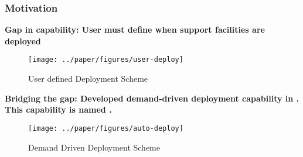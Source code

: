   \begin{frame}
    \frametitle{Motivation}

    \textbf{Gap in capability: User must define when support facilities are deployed} 

    \begin{figure}[htbp!]
      \begin{center}
        \texttt{[image: ../paper/figures/user-deploy]}
      \end{center}
            \caption{User defined Deployment Scheme }
    \end{figure}

    \textbf{Bridging the gap: Developed demand-driven deployment capability in \Cyclus. This capability is named \deploy.}

    \begin{figure}[htbp!]
      \begin{center}
        \texttt{[image: ../paper/figures/auto-deploy]}
      \end{center}
            \caption{Demand Driven Deployment Scheme}
    \end{figure}

  \end{frame}
  